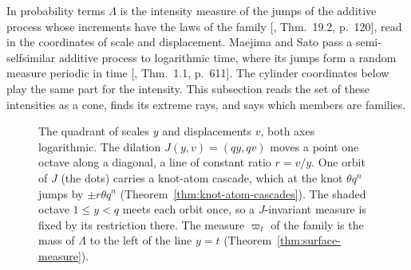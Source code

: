 In probability terms $\Lambda$ is the intensity measure of the jumps of the additive process whose
increments have the laws of the family [, Thm.~19.2, p.~120], read in the
coordinates of scale and displacement. Maejima and Sato pass a semi-selfsimilar additive process to
logarithmic time, where its jumps form a random measure periodic in time
[, Thm.~1.1, p.~611]. The cylinder coordinates below play the same part
for the intensity. This subsection reads the set of these intensities as a cone, finds its extreme rays, and says which
members are families.

\begin{figure}[t]
\centering
{}
\caption{The quadrant of scales $y$ and displacements $v$, both axes logarithmic. The dilation
$J(y,v) = (qy, qv)$ moves a point one octave along a diagonal, a line of constant ratio $r = v/y$.
One orbit of $J$ (the dots) carries a knot-atom cascade, which at the knot $\theta q^n$ jumps by
$\pm r\theta q^n$ (Theorem~\ref{thm:knot-atom-cascades}). The shaded octave $1 \le y < q$ meets
each orbit once, so a $J$-invariant measure is fixed by its restriction there. The \Levy{} measure
$\varpi_t$ of the family is the mass of $\Lambda$ to the left of the line $y = t$
(Theorem~\ref{thm:surface-measure}).}
\label{fig:quadrant}
\end{figure}

